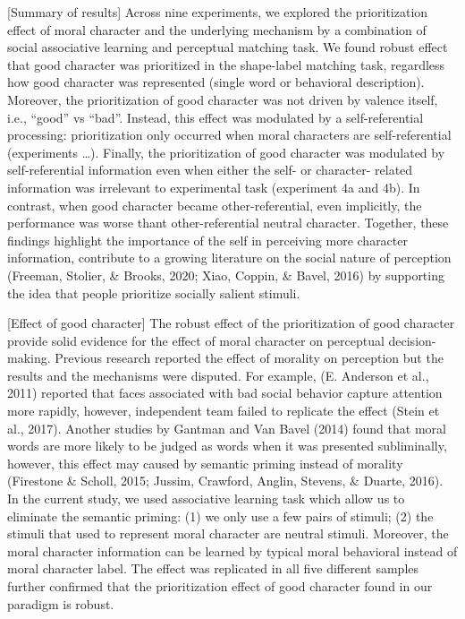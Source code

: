 \documentclass[
  man]{apa6}
\begin{document}
{[}Summary of results{]} Across nine experiments, we explored the prioritization effect of moral character and the underlying mechanism by a combination of social associative learning and perceptual matching task. We found robust effect that good character was prioritized in the shape-label matching task, regardless how good character was represented (single word or behavioral description). Moreover, the prioritization of good character was not driven by valence itself, i.e., ``good'' vs ``bad''. Instead, this effect was modulated by a self-referential processing: prioritization only occurred when moral characters are self-referential (experiments \ldots). Finally, the prioritization of good character was modulated by self-referential information even when either the self- or character- related information was irrelevant to experimental task (experiment 4a and 4b). In contrast, when good character became other-referential, even implicitly, the performance was worse thant other-referential neutral character. Together, these findings highlight the importance of the self in perceiving more character information, contribute to a growing literature on the social nature of perception (Freeman, Stolier, \& Brooks, 2020; Xiao, Coppin, \& Bavel, 2016) by supporting the idea that people prioritize socially salient stimuli.

{[}Effect of good character{]} The robust effect of the prioritization of good character provide solid evidence for the effect of moral character on perceptual decision-making. Previous research reported the effect of morality on perception but the results and the mechanisms were disputed. For example, (E. Anderson et al., 2011) reported that faces associated with bad social behavior capture attention more rapidly, however, independent team failed to replicate the effect (Stein et al., 2017). Another studies by Gantman and Van Bavel (2014) found that moral words are more likely to be judged as words when it was presented subliminally, however, this effect may caused by semantic priming instead of morality (Firestone \& Scholl, 2015; Jussim, Crawford, Anglin, Stevens, \& Duarte, 2016). In the current study, we used associative learning task which allow us to eliminate the semantic priming: (1) we only use a few pairs of stimuli; (2) the stimuli that used to represent moral character are neutral stimuli. Moreover, the moral character information can be learned by typical moral behavioral instead of moral character label. The effect was replicated in all five different samples further confirmed that the prioritization effect of good character found in our paradigm is robust.
\end{document}
